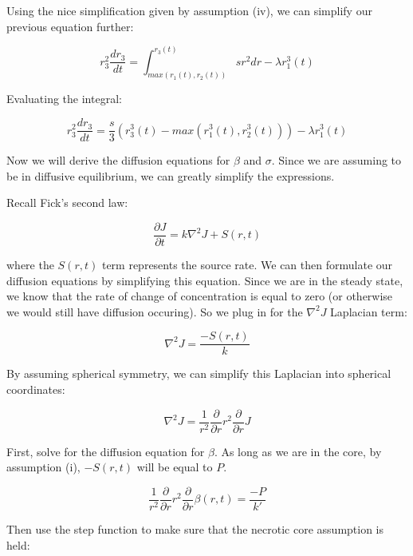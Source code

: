 \documentclass{article}
\begin{document}
Using the nice simplification given by assumption (iv), we can simplify our previous equation further:

\begin{equation}
    r_3^2\frac{dr_3}{dt} = \int_{max(r_1(t), r_2(t))}^{r_3(t)} s r^2 dr - \lambda r_1^3(t)
\end{equation}

Evaluating the integral:

\begin{equation}
    r_3^2\frac{dr_3}{dt} = \frac{s}{3} (r_3^3(t) - max(r_1^3(t), r_2^3(t))) - \lambda r_1^3(t)
\end{equation}

Now we will derive the diffusion equations for $\beta$ and $\sigma$. Since we are assuming to be in diffusive equilibrium, we can greatly simplify the expressions.

Recall Fick's second law:

\begin{equation}
    \frac{\partial J}{\partial t} = k \nabla^2J + S(r, t)
\end{equation}

where the $S(r, t)$ term represents the source rate.
We can then formulate our diffusion equations by simplifying this equation. Since we are in the steady state, we know that the rate of change
of concentration is equal to zero (or otherwise we would still have diffusion occuring). So we plug in for the $\nabla^2J$
Laplacian term:

\begin{equation}
    \nabla^2J = \frac{-S(r, t)}{k}
\end{equation}

By assuming spherical symmetry, we can simplify this Laplacian into spherical coordinates:

\begin{equation}
    \nabla^2J = \frac{1}{r^2} \frac{\partial}{\partial r} r^2 \frac{\partial}{\partial r} J
\end{equation}

First, solve for the diffusion equation for $\beta$. As long as we are in the core, by assumption (i), $-S(r, t)$ will be equal to $P$.

\begin{equation}
    \frac{1}{r^2} \frac{\partial}{\partial r} r^2 \frac{\partial}{\partial r} \beta(r, t) = \frac{-P}{k'}
\end{equation}

Then use the step function to make sure that the necrotic core assumption is held:
\end{document}
